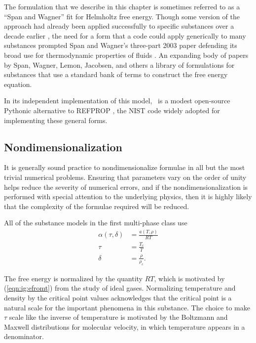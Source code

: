 The formulation that we describe in this chapter is sometimes referred to as a ``Span and Wagner'' fit for Helmholtz free energy.  Though some version of the approach had already been applied successfully to specific substances over a decade earlier \cite{stewart:1991, setzmann:1991}, the need for a form that a code could apply generically to many substances prompted Span and Wagner's three-part 2003 paper defending its broad use for thermodynamic properties of fluids \cite{span:2003:1, span:2003:2, span:2003:3}.  An expanding body of papers by Span, Wagner, Lemon, Jacobsen, and others a library of formulations for substances that use a standard bank of terms to construct the free energy equation.

In its independent implementation of this model, \PM\ is a modest open-source Pythonic alternative to REFPROP \cite{refprop}, the NIST code widely adopted for implementing these general forms.

\subsection{Nondimensionalization}

It is generally sound practice to nondimensionalize formulae in all but the most trivial numerical problems.  Ensuring that parameters vary on the order of unity helps reduce the severity of numerical errors, and if the nondimensionalization is performed with special attention to the underlying physics, then it is highly likely that the complexity of the formulae required will be reduced.

All of the substance models in the first multi-phase class use
\begin{subequations}
\begin{align}
\alpha(\tau,\delta) &= \frac{a(T,\rho)}{R T}\\
\tau &= \frac{T_c}{T}\\
\delta &= \frac{\rho}{\rho_c}.
\end{align}
\end{subequations}

The free energy is normalized by the quantity $R T$, which is motivated by (\ref{eqn:ig:efromt}) from the study of ideal gases.  Normalizing temperature and density by the critical point values acknowledges that the critical point is a natural scale for the important phenomena in this substance.  The choice to make $\tau$ scale like the inverse of temperature is motivated by the Boltzmann and Maxwell distributions for molecular velocity, in which temperature appears in a denominator.

